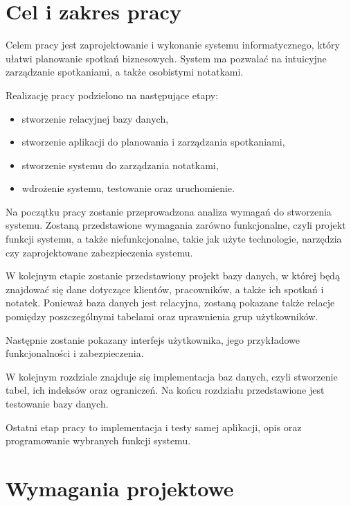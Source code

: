 \documentclass[eng,printmode,openany,oneside]{mgr}
\begin{document}
\chapter{Cel i zakres pracy}
Celem pracy jest zaprojektowanie i wykonanie systemu informatycznego, który ułatwi planowanie spotkań biznesowych. System ma pozwalać na intuicyjne zarządzanie spotkaniami, a także osobistymi notatkami.

Realizację pracy podzielono na następujące etapy:
\begin{itemize}
    \item stworzenie relacyjnej bazy danych,
    \item stworzenie aplikacji do planowania i zarządzania spotkaniami,
    \item stworzenie systemu do zarządzania notatkami,
    \item wdrożenie systemu, testowanie oraz uruchomienie.
\end{itemize}

Na początku pracy zostanie przeprowadzona analiza wymagań do stworzenia systemu. Zostaną przedstawione wymagania zarówno funkcjonalne, czyli projekt funkcji systemu, a także niefunkcjonalne, takie jak użyte technologie, narzędzia czy zaprojektowane zabezpieczenia systemu.

W kolejnym etapie zostanie przedstawiony projekt bazy danych, w której będą znajdować się dane dotyczące klientów, pracowników, a także ich spotkań i notatek. Ponieważ baza danych jest relacyjna, zostaną pokazane także relacje pomiędzy poszczególnymi tabelami oraz uprawnienia grup użytkowników.

Następnie zostanie pokazany interfejs użytkownika, jego przykładowe funkcjonalności i zabezpieczenia.

W kolejnym rozdziale znajduje się implementacja baz danych, czyli stworzenie tabel, ich indeksów oraz ograniczeń. Na końcu rozdziału przedstawione jest testowanie bazy danych.

Ostatni etap pracy to implementacja i testy samej aplikacji, opis oraz programowanie wybranych funkcji systemu. 

\chapter{Wymagania projektowe}
\end{document}
